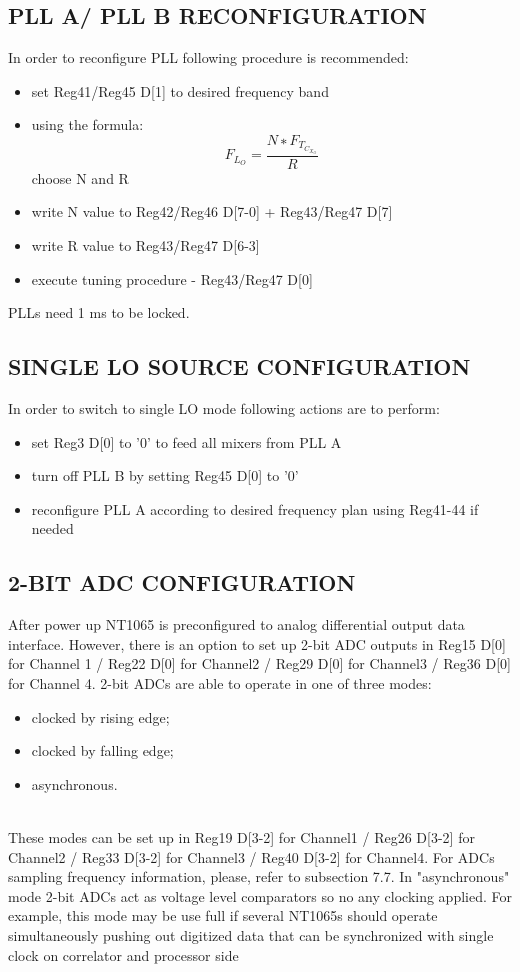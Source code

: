 \documentclass[12pt,a4paper,onecolumn]{article}
\begin{document}
\subsection{PLL A/ PLL B RECONFIGURATION }
In order to reconfigure PLL following procedure is recommended:
\begin{itemize}
 \item set Reg41/Reg45 D[1] to desired frequency band 
\item using the formula: \begin{equation}
F_L_O =\frac{N∗F_T_C_X_O} {R} 
\end{equation} choose N and R 
\item  write N value to Reg42/Reg46 D[7-0] + Reg43/Reg47 D[7] 
\item write R value to Reg43/Reg47 D[6-3] 
\item execute tuning procedure - Reg43/Reg47 D[0] 
\end{itemize}
PLLs need 1 ms to be locked. 

\subsection{SINGLE LO SOURCE CONFIGURATION }
In order to switch to single LO mode following actions are to perform: 
\begin{itemize}
 \item set Reg3 D[0] to '0' to feed all mixers from PLL A 
\item turn off PLL B by setting Reg45 D[0] to '0' 
\item  reconfigure PLL A according to desired frequency plan using Reg41-44 if needed 
\end{itemize}

\subsection{2-BIT ADC CONFIGURATION }
After power up NT1065 is preconfigured to analog differential output data interface. However, there is an option to set up 2-bit ADC outputs in Reg15 D[0] for Channel 1 / Reg22 D[0] for Channel2 / Reg29 D[0] for Channel3 / Reg36 D[0] for Channel 4. 2-bit ADCs are able to operate in one of three modes:
\begin{itemize}
\item clocked by rising edge; 
\item clocked by falling edge;  
\item  asynchronous. 
\end{itemize}
\\
These modes can be set up in Reg19 D[3-2] for Channel1 / Reg26 D[3-2] for Channel2 / Reg33 D[3-2] for Channel3 / Reg40 D[3-2] for Channel4. For ADCs sampling frequency information, please, refer to subsection 7.7. In "asynchronous" mode 2-bit ADCs act as voltage level comparators so no any clocking applied. For example, this mode may be use full if several NT1065s should operate simultaneously pushing out digitized data that can be synchronized with single clock on correlator and processor side
\end{document}
